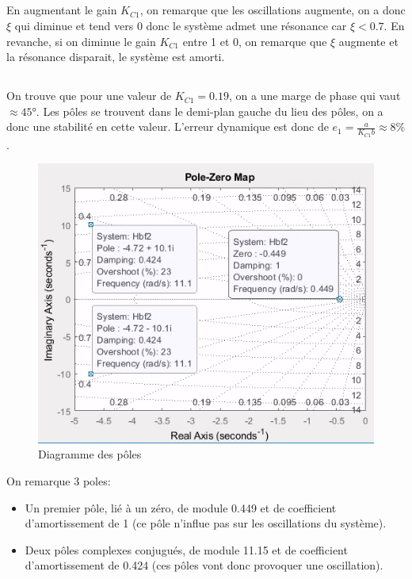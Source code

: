 \documentclass{article}
\begin{document}
\subsection{}
En augmentant le gain $K_{C1}$, on remarque que les oscillations augmente, on a donc $\xi$ qui diminue et tend vers 0 donc le système admet une résonance car $\xi<0.7$. En revanche, si on diminue le gain $K_{C1}$ entre 1 et 0, on remarque que $\xi$ augmente et la résonance disparait, le système est amorti.
\subsection{}
On trouve que pour une valeur de $K_{C1}=0.19$, on a une marge de phase qui vaut $\approx45$°. Les pôles se trouvent dans le demi-plan gauche du lieu des pôles, on a donc une stabilité en cette valeur.
L'erreur dynamique est donc de $e_1=\frac{a}{K_{C1}b}\approx8\%$.
\begin{figure}
    \centering
    \includegraphics[width=0.75\linewidth]{pzmap1311.png}
    \caption{Diagramme des pôles}
    \label{fig:pzmap1311}
\end{figure}
On remarque 3 poles:
\begin{itemize}
    \item Un premier pôle, lié à un zéro, de module 0.449 et de coefficient d'amortissement de 1 (ce pôle n'influe pas sur les oscillations du système).
    \item Deux pôles complexes conjugués, de module 11.15 et de coefficient d'amortissement de 0.424 (ces pôles vont donc provoquer une oscillation).
\end{itemize}
\end{document}
